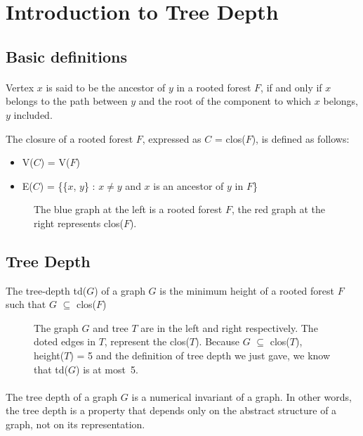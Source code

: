 \section{Introduction to Tree Depth}

\subsection{Basic definitions}

\paragraph{}
Vertex $x$ is said to be the ancestor of $y$ in a rooted forest $F$, if and only if $x$ belongs to the path between $y$ and the root of the component to which $x$ belongs, $y$ included.

\begin{definition}
The closure of a rooted forest $F$, expressed as $C$ = clos($F$), is defined as follows:
\begin{itemize}
  \item V($C$) = V($F$)
  \item E($C$) = \{\{$x$, $y$\} : $x \neq y$ and $x$ is an ancestor of $y$ in $F$\}
\end{itemize}
\end{definition}
\begin{figure}[h]

\caption{The blue graph at the left is a rooted forest $F$, the red graph at the right represents clos($F$).}
\end{figure}

\subsection{Tree Depth}

\begin{definition}
The tree-depth td($G$) of a graph $G$ is the minimum height of a rooted forest $F$ such that $G$ $\subseteq$ clos($F$)
\end{definition}

\begin{figure}[H]

\caption{The graph $G$ and tree $T$ are in the left and right respectively. The doted edges in $T$, represent the clos($T$). Because $G$ $\subseteq$ clos($T$), height($T$) = 5 and the definition of tree depth we just gave, we know that td($G$) is at most~5.\label{fig:3d-cube}}
\end{figure}
\paragraph{}
The tree depth of a graph $G$ is a numerical invariant of a graph. In other words, the tree depth is a property that depends only  on the abstract structure of a graph, not on its representation.	

